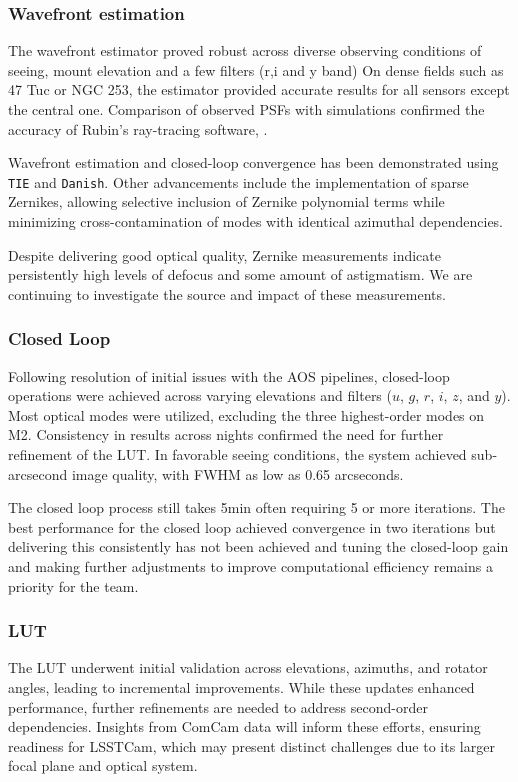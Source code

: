 \subsubsection{Wavefront estimation}
The wavefront estimator proved robust across diverse observing conditions of seeing, mount elevation and a few filters (r,i and y band) 
On dense fields such as 47 Tuc or NGC 253, the estimator provided accurate results for  all sensors except the central one.  Comparison of observed PSFs with simulations  confirmed the  accuracy of Rubin's ray-tracing software, \Batoid.

Wavefront estimation and closed-loop convergence has been demonstrated using \texttt{TIE} and \texttt{Danish}. Other advancements include the implementation of sparse Zernikes,  allowing selective inclusion of Zernike polynomial terms while minimizing cross-contamination 
of modes with identical azimuthal dependencies.

Despite delivering good optical quality, Zernike measurements indicate persistently high levels of defocus and some amount of astigmatism. We are continuing to investigate the source and impact of these measurements.

\subsubsection{Closed Loop}
Following resolution of initial issues with the AOS pipelines,  closed-loop operations were achieved across varying elevations and filters ($u$, $g$, $r$, $i$, $z$, and $y$).  Most optical modes were utilized, excluding the three highest-order modes on M2.  Consistency in results across nights confirmed the need for further refinement of the LUT. In favorable seeing conditions, the system achieved sub-arcsecond image quality, with FWHM as low as 0.65 arcseconds.

The closed loop process still takes 5min  often requiring 5 or more iterations. The best performance for the closed loop achieved convergence in two iterations but delivering this consistently has not been achieved and tuning the closed-loop gain and making further adjustments to improve computational  efficiency remains a priority for the team.

\subsubsection{LUT}
The LUT underwent initial validation across elevations, azimuths, and rotator angles, 
leading to incremental improvements. While these updates enhanced performance, 
further refinements are needed to address second-order dependencies. Insights 
from ComCam data will inform these efforts, ensuring readiness for LSSTCam, which 
may present distinct challenges due to its larger focal plane and optical system.

